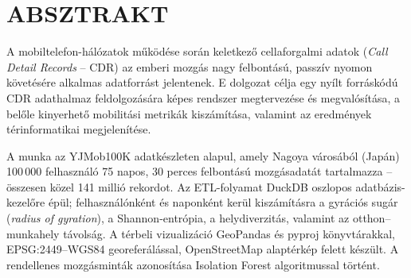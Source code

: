 
\usepackage{tikz}
\usetikzlibrary{shapes.geometric, arrows.meta, positioning, shadows}



\usepackage[acronym,automake]{glossaries-extra}
\makeglossaries


\usepackage[utf8]{inputenc}




 


 







\section*{ABSZTRAKT}

A mobiltelefon-hálózatok működése során keletkező cellaforgalmi adatok (\textit{Call Detail Records} – CDR) az emberi mozgás nagy felbontású, passzív nyomon követésére alkalmas adatforrást jelentenek. E dolgozat célja egy nyílt forráskódú CDR adathalmaz feldolgozására képes rendszer megtervezése és megvalósítása, a belőle kinyerhető mobilitási metrikák kiszámítása, valamint az eredmények térinformatikai megjelenítése.

A munka az YJMob100K adatkészleten alapul, amely Nagoya városából (Japán) 100\,000 felhasználó 75 napos, 30 perces felbontású mozgásadatát tartalmazza – összesen közel 141 millió rekordot. Az ETL-folyamat DuckDB oszlopos adatbázis-kezelőre épül; felhasználónként és naponként kerül kiszámításra a gyrációs sugár (\textit{radius of gyration}), a Shannon-entrópia, a helydiverzitás, valamint az otthon–munkahely távolság. A térbeli vizualizáció GeoPandas és pyproj könyvtárakkal, EPSG:2449–WGS84 georeferálással, OpenStreetMap alaptérkép felett készült. A rendellenes mozgásminták azonosítása Isolation Forest algoritmussal történt.

